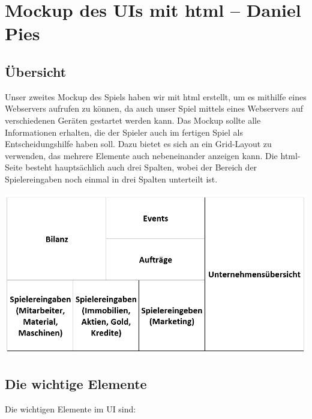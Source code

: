 \chapter{Mockup des UIs mit html -- Daniel Pies}

\section{Übersicht}

Unser zweites Mockup des Spiels haben wir mit html erstellt, um es mithilfe eines Webservers aufrufen zu können, da auch unser Spiel mittels eines Webservers auf verschiedenen Geräten gestartet werden kann. Das Mockup sollte alle Informationen erhalten, die der Spieler auch im fertigen Spiel als Entscheidungshilfe haben soll. Dazu bietet es sich an ein Grid-Layout zu verwenden, das mehrere Elemente auch nebeneinander anzeigen kann. Die html-Seite besteht hauptsächlich auch drei Spalten, wobei der Bereich der Spielereingaben noch einmal in drei Spalten unterteilt ist.


\begin{minipage}{\linewidth}
	\centering
	\includegraphics[scale=0.6]{img/Uebersicht.png}
	\vspace{1em}
\end{minipage}

\newpage

\section{Die wichtige Elemente}

Die wichtigen Elemente im UI sind:

